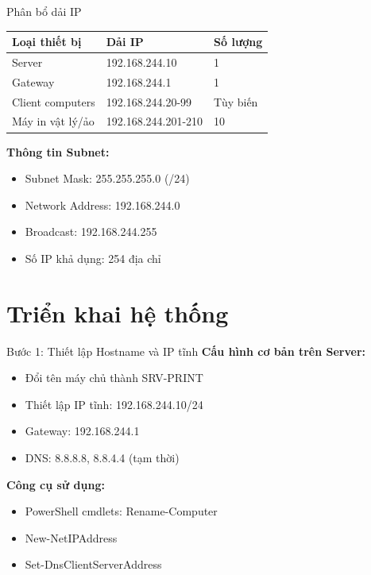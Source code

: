 \documentclass{beamer}
\begin{document}
    \begin{frame}{Phân bổ dải IP}
        \begin{table}[ht]
            \centering
            \small
            \begin{tabular}{|l|l|l|}
            \hline
            \textbf{Loại thiết bị} & \textbf{Dải IP} & \textbf{Số lượng} \\
            \hline
            Server & 192.168.244.10 & 1 \\
            \hline
            Gateway & 192.168.244.1 & 1 \\
            \hline
            Client computers & 192.168.244.20-99 & Tùy biến \\
            \hline
            Máy in vật lý/ảo & 192.168.244.201-210 & 10 \\
            \hline
            \end{tabular}
        \end{table}
        
        \vspace{0.3cm}
        \textbf{Thông tin Subnet:}
        \begin{itemize}
            \item Subnet Mask: 255.255.255.0 (/24)
            \item Network Address: 192.168.244.0
            \item Broadcast: 192.168.244.255
            \item Số IP khả dụng: 254 địa chỉ
        \end{itemize}
    \end{frame}

    \section{Triển khai hệ thống}
    \begin{frame}{Bước 1: Thiết lập Hostname và IP tĩnh}
        \textbf{Cấu hình cơ bản trên Server:}
        \begin{itemize}
            \item Đổi tên máy chủ thành SRV-PRINT
            \item Thiết lập IP tĩnh: 192.168.244.10/24
            \item Gateway: 192.168.244.1
            \item DNS: 8.8.8.8, 8.8.4.4 (tạm thời)
        \end{itemize}
        
        \vspace{0.3cm}
        \textbf{Công cụ sử dụng:}
        \begin{itemize}
            \item PowerShell cmdlets: Rename-Computer
            \item New-NetIPAddress
            \item Set-DnsClientServerAddress
        \end{itemize}
    \end{frame}
    
\end{document}
